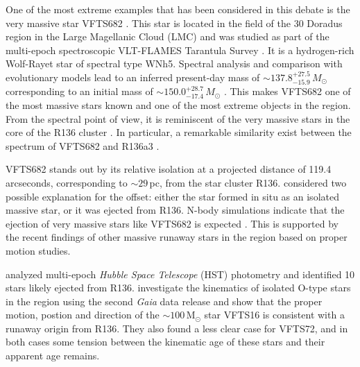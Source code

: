 \documentclass[apjl,twocolumn]{emulateapj}
\newcommand{\Msun}{{\,\mathrm{M}_\odot}}
\begin{document}
One of the most extreme examples that has been considered in this debate is the very massive star VFTS682  \citep[][]{bestenlehner:11, bressert:12}. This star is located in the field of the 30 Doradus region in the Large Magellanic Cloud (LMC) and was studied as part of the multi-epoch spectroscopic VLT-FLAMES Tarantula Survey \citep[VFTS,][]{evans:11}. It is a hydrogen-rich Wolf-Rayet star of spectral type WNh5. Spectral analysis and comparison with evolutionary models lead to an inferred present-day mass of $\sim$$137.8^{+27.5}_{-15.9}\,M_\odot$ corresponding to an initial mass of $\sim$$150.0^{+28.7}_{-17.4}\,M_\odot$
\citep{schneider:18}. 
%
%
This makes VFTS682 one of the most massive stars known and one of the most extreme objects in the region.
%
From the spectral point of view, it is reminiscent of the very
massive stars %
 in the core of the R136 cluster \citep{dekoter:97,crowther:10, crowther:16}. 
 In particular, a remarkable similarity exist between the
spectrum of VFTS682 and R136a3 \citep{rubio-diez:17}.%


VFTS682 stands out by its relative isolation at a projected distance of 119.4 arcseconds, corresponding to 
$\sim$$29$\,pc, from  the star cluster R136. \citet{bestenlehner:11}
considered two possible explanation for the offset: either
the star formed in situ as an isolated massive star, %
or it was ejected from  R136. N-body simulations %
indicate that the ejection of very massive stars like VFTS682 is
expected \citep[e.g.][]{fujii:11, banerjee:12}.  This is supported by
the recent findings of other massive runaway stars in the region based
on proper motion studies.

\citet{platais:15,platais:18} analyzed multi-epoch \emph{Hubble Space
  Telescope} (HST) photometry and identified 10 stars likely ejected
from R136. \citet{lennon:18} investigate the kinematics of  isolated
O-type stars in the region using the second \emph{Gaia} data release
\cite[DR2,][]{gaia:16,brown:18} and show that the proper motion,
postion and direction of the $\sim$$100\Msun$ star VFTS16 is consistent
with a runaway origin from R136. They also found a less clear case for
VFTS72, and in both cases some tension between the kinematic age of
these stars and their apparent age remains. 
\end{document}
